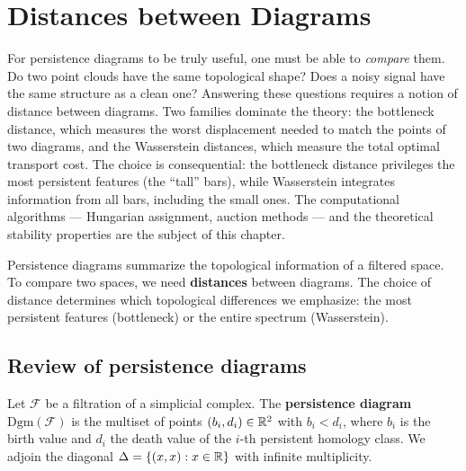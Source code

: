 \chapter{Distances between Diagrams}
\label{ch:distances}

For persistence diagrams to be truly useful, one must be able to \emph{compare} them. Do two point clouds have the same topological shape? Does a noisy signal have the same structure as a clean one? Answering these questions requires a notion of distance between diagrams. Two families dominate the theory: the bottleneck distance, which measures the worst displacement needed to match the points of two diagrams, and the Wasserstein distances, which measure the total optimal transport cost. The choice is consequential: the bottleneck distance privileges the most persistent features (the ``tall'' bars), while Wasserstein integrates information from all bars, including the small ones. The computational algorithms --- Hungarian assignment, auction methods --- and the theoretical stability properties are the subject of this chapter.

\begin{intuition}
Persistence diagrams summarize the topological
information of a filtered space. To compare two spaces, we need
\textbf{distances} between diagrams. The choice of distance determines
which topological differences we emphasize: the most persistent features
(bottleneck) or the entire spectrum
(Wasserstein).
\end{intuition}

\section{Review of persistence diagrams}

\begin{definition}
Let $\mathcal{F}$ be a filtration of a simplicial complex. The
\textbf{persistence diagram}
$\mathrm{Dgm}(\mathcal{F})$ is the multiset of points
$(b_i, d_i) \in \mathbb{R}^2$ with $b_i < d_i$, where $b_i$ is the birth
value and $d_i$ the death value of the $i$-th persistent homology
class. We adjoin the diagonal
$\Delta = \{(x,x) : x \in \mathbb{R}\}$ with infinite multiplicity.
\end{definition}

